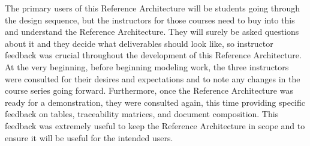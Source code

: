The primary users of this Reference Architecture will be students going through the design sequence, but the instructors for those courses need to buy into this and understand the Reference Architecture. They will surely be asked questions about it and they decide what deliverables should look like, so instructor feedback was crucial throughout the development of this Reference Architecture. At the very beginning, before beginning modeling work, the three instructors were consulted for their desires and expectations and to note any changes in the course series going forward. Furthermore, once the Reference Architecture was ready for a demonstration, they were consulted again, this time providing specific feedback on tables, traceability matrices, and document composition. This feedback was extremely useful to keep the Reference Architecture in scope and to ensure it will be useful for the intended users.  